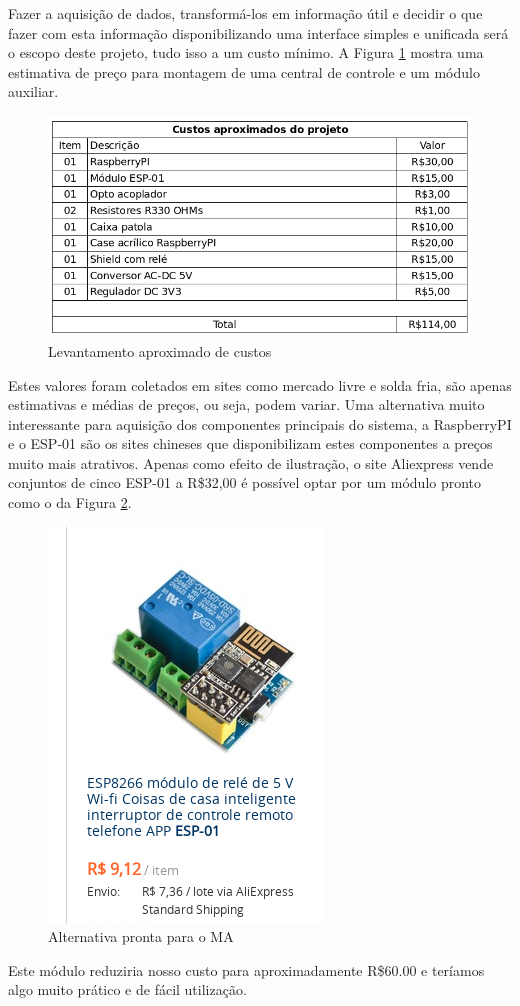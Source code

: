 Fazer a aquisição de dados, transformá-los em informação útil e decidir o que fazer com esta informação disponibilizando uma interface simples e unificada será o escopo deste projeto, tudo isso a um custo mínimo. A Figura \ref{custos} mostra uma estimativa de preço para montagem de uma central de controle e um módulo auxiliar.

\begin{figure}[H]
\caption{\label{custos} Levantamento aproximado de custos}
\includegraphics[scale=0.4]{img/custos.png}
\end{figure}

Estes valores foram coletados em sites como mercado livre e solda fria, são apenas estimativas e médias de preços, ou seja, podem variar. Uma alternativa muito interessante para aquisição dos componentes principais do sistema, a RaspberryPI e o ESP-01 são os sites chineses que disponibilizam estes componentes a preços muito mais atrativos. Apenas como efeito de ilustração, o site Aliexpress vende conjuntos de cinco ESP-01 a R\$32,00 é possível optar por um módulo pronto como o da Figura \ref{modulo-ali}.

\begin{figure}[H]
\caption{\label{modulo-ali} Alternativa pronta para o MA}
\includegraphics[scale=0.4]{img/modulo-ali.png}
\end{figure}

Este módulo reduziria nosso custo para aproximadamente R\$60.00 e teríamos algo muito prático e de fácil utilização.


